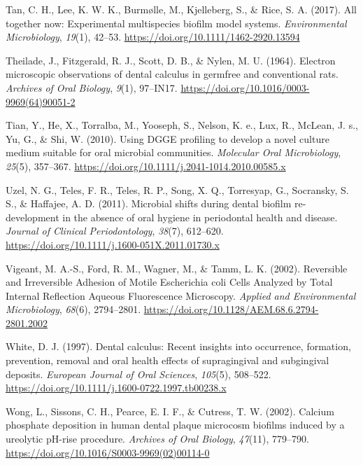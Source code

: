 \documentclass[
  b5paper,
]{book}
\newlength{\cslhangindent}
\newlength{\cslentryspacingunit} %
\newenvironment{CSLReferences}[2] %
 {%
  \setlength{\parindent}{0pt}
  \ifodd #1
  \let\oldpar\par
  \def\par{\hangindent=\cslhangindent\oldpar}
  \fi
  \setlength{\parskip}{#2\cslentryspacingunit}
 }%
 {}
\begin{document}
\begin{CSLReferences}{1}{0}
\leavevmode{}%
Tan, C. H., Lee, K. W. K., Burmølle, M., Kjelleberg, S., \& Rice, S. A.
(2017). All together now: Experimental multispecies biofilm model
systems. \emph{Environmental Microbiology}, \emph{19}(1), 42--53.
\url{https://doi.org/10.1111/1462-2920.13594}

\leavevmode{}%
Theilade, J., Fitzgerald, R. J., Scott, D. B., \& Nylen, M. U. (1964).
Electron microscopic observations of dental calculus in germfree and
conventional rats. \emph{Archives of Oral Biology}, \emph{9}(1),
97--IN17. \url{https://doi.org/10.1016/0003-9969(64)90051-2}

\leavevmode{}%
Tian, Y., He, X., Torralba, M., Yooseph, S., Nelson, K. e., Lux, R.,
McLean, J. s., Yu, G., \& Shi, W. (2010). Using {DGGE} profiling to
develop a novel culture medium suitable for oral microbial communities.
\emph{Molecular Oral Microbiology}, \emph{25}(5), 357--367.
\url{https://doi.org/10.1111/j.2041-1014.2010.00585.x}

\leavevmode{}%
Uzel, N. G., Teles, F. R., Teles, R. P., Song, X. Q., Torresyap, G.,
Socransky, S. S., \& Haffajee, A. D. (2011). Microbial shifts during
dental biofilm re-development in the absence of oral hygiene in
periodontal health and disease. \emph{Journal of Clinical
Periodontology}, \emph{38}(7), 612--620.
\url{https://doi.org/10.1111/j.1600-051X.2011.01730.x}

\leavevmode{}%
Vigeant, M. A.-S., Ford, R. M., Wagner, M., \& Tamm, L. K. (2002).
Reversible and {Irreversible Adhesion} of {Motile Escherichia} coli
{Cells Analyzed} by {Total Internal Reflection Aqueous Fluorescence
Microscopy}. \emph{Applied and Environmental Microbiology},
\emph{68}(6), 2794--2801.
\url{https://doi.org/10.1128/AEM.68.6.2794-2801.2002}

\leavevmode{}%
White, D. J. (1997). Dental calculus: Recent insights into occurrence,
formation, prevention, removal and oral health effects of supragingival
and subgingival deposits. \emph{European Journal of Oral Sciences},
\emph{105}(5), 508--522.
\url{https://doi.org/10.1111/j.1600-0722.1997.tb00238.x}

\leavevmode{}%
Wong, L., Sissons, C. H., Pearce, E. I. F., \& Cutress, T. W. (2002).
Calcium phosphate deposition in human dental plaque microcosm biofilms
induced by a ureolytic {pH-rise} procedure. \emph{Archives of Oral
Biology}, \emph{47}(11), 779--790.
\url{https://doi.org/10.1016/S0003-9969(02)00114-0}


\end{CSLReferences}
\end{document}
